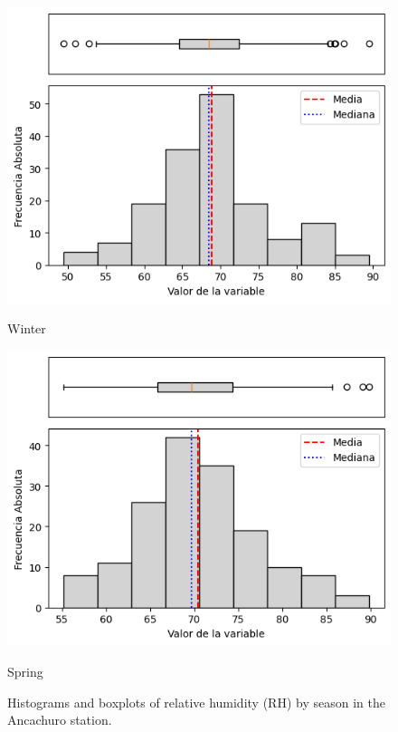 \begin{figure}[htbp]
\vspace{0.2cm}

\begin{minipage}{0.30\textwidth}
  \includegraphics[width=\linewidth]{resultados/por_estacion_del_anio/boxplot_clases_por_estacion/Ancachuro/RH_HistBoxplot_Winter.png}
  \caption*{Winter}
\end{minipage}
\hfill
\begin{minipage}{0.30\textwidth}
  \includegraphics[width=\linewidth]{resultados/por_estacion_del_anio/boxplot_clases_por_estacion/Ancachuro/RH_HistBoxplot_Spring.png}
  \caption*{Spring}
\end{minipage}
\caption{Histograms and boxplots of relative humidity (RH) by season in the Ancachuro station.}
\label{fig:ancachuro_rh_hist}
\end{figure}

